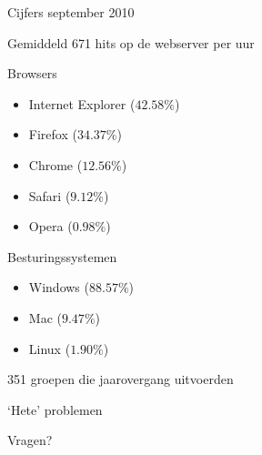 \documentclass[chiro,pdf]{prosper}
\begin{document}
{
\begin{slide}{Cijfers september 2010}

\begin{itemstep}
\item Gemiddeld 671 hits op de webserver per uur
\item Browsers
\begin{itemize}
\item Internet Explorer ($42.58 \%$)
\item Firefox ($34.37 \%$)
\item Chrome ($12.56 \%$)
\item Safari ($9.12 \%$)
\item Opera ($0.98 \%$)
\end{itemize}
\item Besturingssystemen
\begin{itemize}
\item Windows ($88.57 \%$)
\item Mac ($9.47 \%$)
\item Linux ($1.90 \%$)
\end{itemize}
\item{351 groepen die jaarovergang uitvoerden}
\end{itemstep}

\end{slide}
}

%
%

{
\begin{slide}{`Hete' problemen}
\begin{itemize}
\end{itemize}
\end{slide}
}


%
%

\begin{slide}{Vragen?}
\end{slide}
\end{document}
